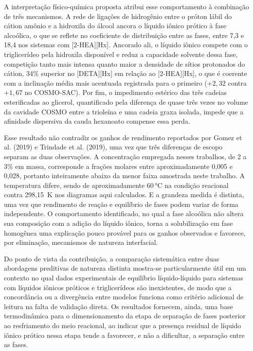 A interpretação físico-química proposta atribui esse comportamento à combinação de três mecanismos. A rede de ligações de hidrogênio entre o próton lábil do cátion amônio e a hidroxila do álcool ancora o líquido iônico prótico à fase alcoólica, o que se reflete no coeficiente de distribuição entre as fases, entre 7,3 e 18,4 nos sistemas com [2-HEA][Hx]. Ancorado ali, o líquido iônico compete com o triglicerídeo pela hidroxila disponível e reduz a capacidade solvente dessa fase, competição tanto mais intensa quanto maior a densidade de sítios protonados do cátion, 34\% superior no [DETA][Hx] em relação ao [2-HEA][Hx], o que é coerente com a inclinação média mais acentuada registrada para o primeiro ($+2{,}32$ contra $+1{,}67$ no COSMO-SAC). Por fim, o impedimento estérico das três cadeias esterificadas ao glicerol, quantificado pela diferença de quase três vezes no volume da cavidade COSMO entre a trioleína e uma cadeia graxa isolada, impede que a afinidade dispersiva da cauda hexanoato compense essa perda.

Esse resultado não contradiz os ganhos de rendimento reportados por Gomez et al. (2019) e Trindade et al. (2019), uma vez que três diferenças de escopo separam as duas observações. A concentração empregada nesses trabalhos, de 2 a 3\% em massa, corresponde a frações molares entre aproximadamente 0,005 e 0,028, portanto inteiramente abaixo da menor faixa amostrada neste trabalho. A temperatura difere, sendo de aproximadamente 60\,°C na condição reacional contra 298,15~K nos diagramas aqui calculados. E a grandeza medida é distinta, uma vez que rendimento de reação e equilíbrio de fases podem variar de forma independente. O comportamento identificado, no qual a fase alcoólica não altera sua composição com a adição do líquido iônico, torna a solubilização em fase homogênea uma explicação pouco provável para os ganhos observados e favorece, por eliminação, mecanismos de natureza interfacial.

Do ponto de vista da contribuição, a comparação sistemática entre duas abordagens preditivas de natureza distinta mostra-se particularmente útil em um contexto no qual dados experimentais de equilíbrio líquido-líquido para sistemas com líquidos iônicos próticos e triglicerídeos são inexistentes, de modo que a concordância ou a divergência entre modelos funciona como critério adicional de leitura na falta de validação direta. Os resultados fornecem, ainda, uma base termodinâmica para o dimensionamento da etapa de separação de fases posterior ao resfriamento do meio reacional, ao indicar que a presença residual de líquido iônico prótico nessa etapa tende a favorecer, e não a dificultar, a separação entre as fases.

